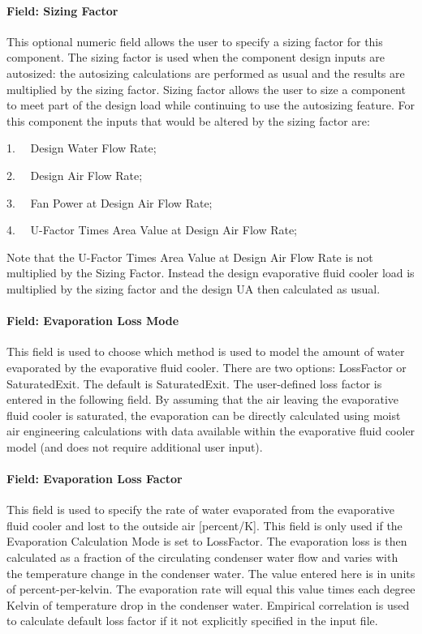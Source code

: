 \paragraph{Field: Sizing Factor}\label{field-sizing-factor-3}

This optional numeric field allows the user to specify a sizing factor for this component. The sizing factor is used when the component design inputs are autosized: the autosizing calculations are performed as usual and the results are multiplied by the sizing factor. Sizing factor allows the user to size a component to meet part of the design load while continuing to use the autosizing feature. For this component the inputs that would be altered by the sizing factor are:

1.~~ Design Water Flow Rate;

2.~~ Design Air Flow Rate;

3.~~ Fan Power at Design Air Flow Rate;

4.~~ U-Factor Times Area Value at Design Air Flow Rate;

Note that the U-Factor Times Area Value at Design Air Flow Rate is not multiplied by the Sizing Factor. Instead the design evaporative fluid cooler load is multiplied by the sizing factor and the design UA then calculated as usual.

\paragraph{Field: Evaporation Loss Mode}\label{field-evaporation-loss-mode-4}

This field is used to choose which method is used to model the amount of water evaporated by the evaporative fluid cooler. There are two options: LossFactor or SaturatedExit. The default is SaturatedExit. The user-defined loss factor is entered in the following field. By assuming that the air leaving the evaporative fluid cooler is saturated, the evaporation can be directly calculated using moist air engineering calculations with data available within the evaporative fluid cooler model (and does not require additional user input).

\paragraph{Field: Evaporation Loss Factor}\label{field-evaporation-loss-factor-4}

This field is used to specify the rate of water evaporated from the evaporative fluid cooler and lost to the outside air {[}percent/K{]}. This field is only used if the Evaporation Calculation Mode is set to LossFactor. The evaporation loss is then calculated as a fraction of the circulating condenser water flow and varies with the temperature change in the condenser water. The value entered here is in units of percent-per-kelvin. The evaporation rate will equal this value times each degree Kelvin of temperature drop in the condenser water. Empirical correlation is used to calculate default loss factor if it not explicitly specified in the input file.

